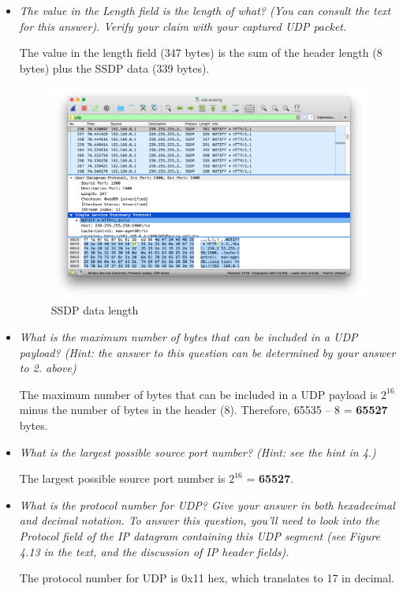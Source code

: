 \documentclass[11pt]{article}
\begin{document}
\begin{itemize}
	\item
		\textit{The value in the Length field is the length of what? (You can consult the text for this answer). Verify your claim with your captured UDP packet.}
		\par The value in the length field (347 bytes) is the sum of the header length (8 bytes) plus the SSDP data (339 bytes).
		
		\begin{figure}[H]
		\centering
		\caption{SSDP data length}
		\includegraphics[width=\textwidth]{03}
		\end{figure}
		
	\item
		\textit{What is the maximum number of bytes that can be included in a UDP payload? (Hint: the answer to this question can be determined by your answer to 2. above)}
		\par The maximum number of bytes that can be included in a UDP payload is $2^{16}$ minus the number of bytes in the header (8). Therefore, 65535 – 8 = \textbf{65527} bytes.
		
	\item
		\textit{What is the largest possible source port number? (Hint: see the hint in 4.)}
		\par The largest possible source port number is $2^{16}$ = \textbf{65527}.
		
\pagebreak

	\item
		\textit{What is the protocol number for UDP? Give your answer in both hexadecimal and decimal notation. To answer this question, you’ll need to look into the Protocol field of the IP datagram containing this UDP segment (see Figure 4.13 in the text, and the discussion of IP header fields).}
		\par The protocol number for UDP is 0x11 hex, which translates to 17 in decimal.
		

\end{itemize}
\end{document}
